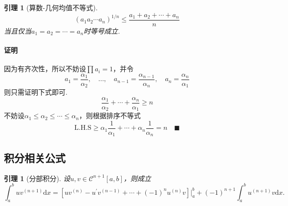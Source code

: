 \documentclass[12pt, a4paper]{article}
\theoremstyle{margin}
\newtheorem{lemma}[thm]{引理}
\newcommand{\hp}{^\prime}
\newcommand{\ms}{\mathscr}
\newcommand{\rd}{\mathrm{d}}
\newcommand{\lhs}{\text{L.H.S}}
\newcommand{\proof}{\paragraph{证明}}
\begin{document}
  \begin{lemma}[算数-几何均值不等式]
    \[
      (a_1a_2\cdots a_n)^{1/n} \le \frac{a_1+a_2+\cdots+a_n}{n}
    \]
    当且仅当$a_1 = a_2 = \cdots = a_n$时等号成立.
  \end{lemma}
  \proof
    因为有齐次性，所以不妨设$\prod a_i=1$，并令
    \[
      a_1=\frac{\alpha_1}{\alpha_2},\quad
      \dots,\quad
      a_{n-1} = \frac{\alpha_{n-1}}{\alpha_n},\quad
      a_n = \frac{\alpha_n}{\alpha_1}
    \]
    则只需证明下式即可.
    \[
      \frac{\alpha_1}{\alpha_2} + \cdots + \frac{\alpha_n}{\alpha_1}
      \ge n
    \]
    不妨设$\alpha_1 \le \alpha_2 \le \cdots \le \alpha_n$，则根据排序不等式
    \[
      \lhs \ge \alpha_1\frac{1}{\alpha_1} + \cdots + \alpha_n\frac{1}{\alpha_n}
       = n \quad\blacksquare
    \]

\newpage
\subsection{积分相关公式}
  \begin{lemma}[分部积分]
    设$u,v\in\ms{C}^{n+1}[a, b]$，则成立
    \[
      \int_a^buv^{(n+1)}\rd x =
      [ uv^{(n)} - u\hp v^{(n-1)} + \cdots +  (-1)^nu^{(n)}v]
      \bigg\vert_a^b + (-1)^{n+1}\int_a^bu^{(n+1)}v\rd x.
    \]
  \end{lemma}
\end{document}
